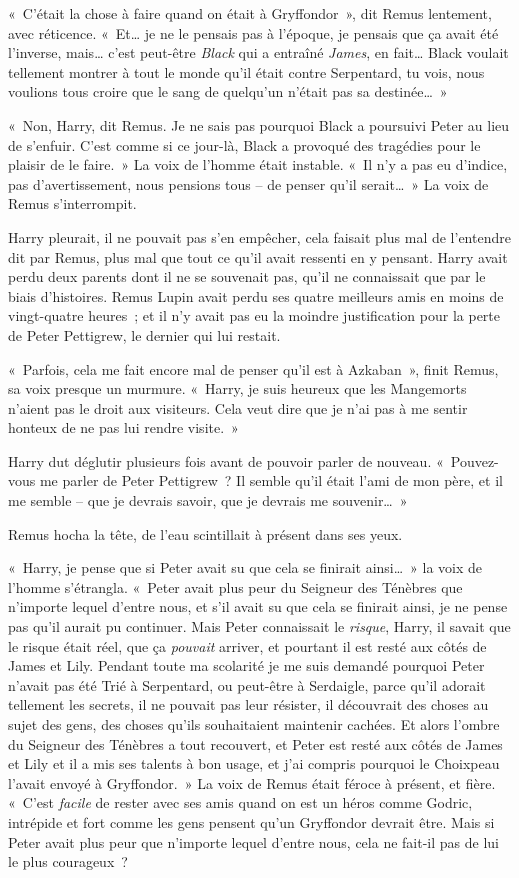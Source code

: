 «~C'était la chose à faire quand on était à Gryffondor~», dit Remus lentement, avec réticence.
«~Et… je ne le pensais pas à l'époque, je pensais que ça avait été l'inverse, mais… c'est peut-être \emph{Black} qui a entraîné \emph{James}, en fait…
Black voulait tellement montrer à tout le monde qu'il était contre Serpentard, tu vois, nous voulions tous croire que le sang de quelqu'un n'était pas sa destinée…~»

\later

«~Non, Harry, dit Remus.
Je ne sais pas pourquoi Black a poursuivi Peter au lieu de s'enfuir.
C'est comme si ce jour-là, Black a provoqué des tragédies pour le plaisir de le faire.~»
La voix de l'homme était instable.
«~Il n'y a pas eu d'indice, pas d'avertissement, nous pensions tous -- de penser qu'il serait…~»
La voix de Remus s'interrompit.

Harry pleurait, il ne pouvait pas s'en empêcher, cela faisait plus mal de l'entendre dit par Remus, plus mal que tout ce qu'il avait ressenti en y pensant.
Harry avait perdu deux parents dont il ne se souvenait pas, qu'il ne connaissait que par le biais d'histoires.
Remus Lupin avait perdu ses quatre meilleurs amis en moins de vingt-quatre heures~; et il n'y avait pas eu la moindre justification pour la perte de Peter Pettigrew, le dernier qui lui restait.

«~Parfois, cela me fait encore mal de penser qu'il est à Azkaban~», finit Remus, sa voix presque un murmure.
«~Harry, je suis heureux que les Mangemorts n'aient pas le droit aux visiteurs.
Cela veut dire que je n'ai pas à me sentir honteux de ne pas lui rendre visite.~»

Harry dut déglutir plusieurs fois avant de pouvoir parler de nouveau.
«~Pouvez-vous me parler de Peter Pettigrew~?
Il semble qu'il était l'ami de mon père, et il me semble -- que je devrais savoir, que je devrais me souvenir…~»

Remus hocha la tête, de l'eau scintillait à présent dans ses yeux.

«~Harry, je pense que si Peter avait su que cela se finirait ainsi…~»
la voix de l'homme s'étrangla.
«~Peter avait plus peur du Seigneur des Ténèbres que n'importe lequel d'entre nous, et s'il avait su que cela se finirait ainsi, je ne pense pas qu'il aurait pu continuer.
Mais Peter connaissait le \emph{risque}, Harry, il savait que le risque était réel, que ça \emph{pouvait} arriver, et pourtant il est resté aux côtés de James et Lily.
Pendant toute ma scolarité je me suis demandé pourquoi Peter n'avait pas été Trié à Serpentard, ou peut-être à Serdaigle, parce qu'il adorait tellement les secrets, il ne pouvait pas leur résister, il découvrait des choses au sujet des gens, des choses qu'ils souhaitaient maintenir cachées.
Et alors l'ombre du Seigneur des Ténèbres a tout recouvert, et Peter est resté aux côtés de James et Lily et il a mis ses talents à bon usage, et j'ai compris pourquoi le Choixpeau l'avait envoyé à Gryffondor.~»
La voix de Remus était féroce à présent, et fière.
«~C'est \emph{facile} de rester avec ses amis quand on est un héros comme Godric, intrépide et fort comme les gens pensent qu'un Gryffondor devrait être.
Mais si Peter avait plus peur que n'importe lequel d'entre nous, cela ne fait-il pas de lui le plus courageux~?

